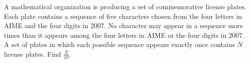 A mathematical organization is producing a set of commemorative license plates. Each plate contains a sequence of five characters chosen from the four letters in AIME and the four digits in $2007$. No character may appear in a sequence more times than it appears among the four letters in AIME or the four digits in $2007$. A set of plates in which each possible sequence appears exactly once contains $N$ license plates. Find $\frac{N}{10}$.